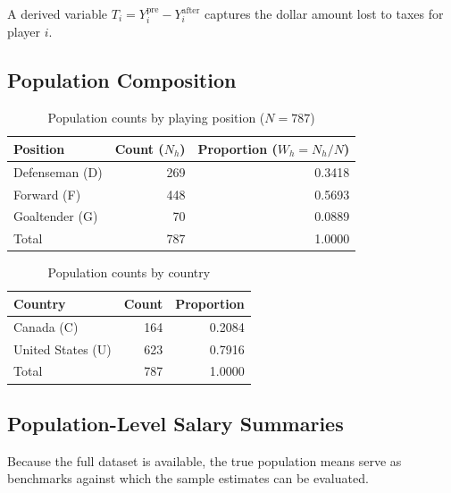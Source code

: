 \documentclass[12pt]{article}
\begin{document}
A derived variable $T_i = Y_i^{\mathrm{pre}} - Y_i^{\mathrm{after}}$ captures the
dollar amount lost to taxes for player $i$.

\subsection{Population Composition}

\begin{table}[H]
\centering
\caption{Population counts by playing position ($N = 787$)}
\label{tab:pop}
\begin{tabular}{lrr}
\toprule
Position & Count ($N_h$) & Proportion ($W_h = N_h/N$) \\
\midrule
Defenseman (D) & 269 & 0.3418 \\
Forward (F)    & 448 & 0.5693 \\
Goaltender (G) &  70 & 0.0889 \\
\midrule
Total          & 787 & 1.0000 \\
\bottomrule
\end{tabular}
\end{table}

\begin{table}[H]
\centering
\caption{Population counts by country}
\label{tab:pop_country}
\begin{tabular}{lrr}
\toprule
Country           & Count & Proportion \\
\midrule
Canada (C)        & 164   & 0.2084 \\
United States (U) & 623   & 0.7916 \\
\midrule
Total             & 787   & 1.0000 \\
\bottomrule
\end{tabular}
\end{table}

\subsection{Population-Level Salary Summaries}

Because the full dataset is available, the true population means serve as benchmarks
against which the sample estimates can be evaluated.
\end{document}
